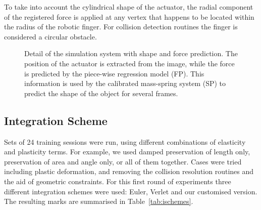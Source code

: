 \documentclass[journal]{IEEEtran}
\newcommand{\tref}[1]{Table~\ref{#1}}
\begin{document}
To take into account the cylindrical shape of the actuator, the radial component of the registered force is applied at any vertex that happens to be located within the radius of the robotic finger.  For collision detection routines the finger is considered a circular obstacle.

\begin{figure}[!t]
\centering
\setlength\fboxsep{0pt}    %
\setlength\fboxrule{0.5pt} %
\caption{Detail of the simulation system with shape and force prediction.  The position of the actuator is extracted from the image, while the force is predicted by the piece-wise regression model (FP). This information is used by the calibrated mass-spring system (SP) to predict the shape of the object for several frames. }\label{fig:diagram}
\end{figure}

\subsection{Integration Scheme}
Sets of 24 training sessions were run, using different combinations of elasticity and plasticity terms.  For example, we used damped preservation of length only, preservation of area and angle only, or all of them together. Cases were tried including plastic deformation, and removing the collision resolution routines and the aid of geometric constraints.  For this first round of experiments three different integration schemes were used: Euler, Verlet and our customised version.  The resulting marks are summarised in \tref{tab:ischemes}.
\end{document}
